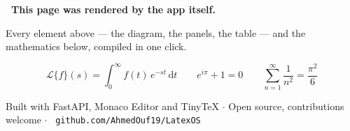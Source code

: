 \documentclass[a4paper,10pt]{article}
\begin{document}
\begin{tcolorbox}[colback=paper, colframe=accent!55!white, boxrule=0.6pt,
                  arc=3pt, left=10pt, right=10pt, top=7pt, bottom=7pt]
  \begin{center}
    {\color{accent}\bfseries\faCheckCircle~This page was rendered by the app itself.}\par\vspace{2pt}
    {\footnotesize Every element above --- the diagram, the panels, the table ---
     and the mathematics below, compiled in one click.}
  \end{center}
  \vspace{2pt}
  \[
    \mathcal{L}\{f\}(s)=\int_{0}^{\infty} f(t)\,e^{-st}\,\mathrm{d}t
    \qquad
    e^{i\pi}+1=0
    \qquad
    \sum_{n=1}^{\infty}\frac{1}{n^{2}}=\frac{\pi^{2}}{6}
  \]
\end{tcolorbox}

\vfill

\begin{center}
  {\color{muted}\footnotesize
  Built with FastAPI, Monaco Editor and TinyTeX \; $\cdot$ \;
  Open source, contributions welcome \; $\cdot$ \;
  \faGithub~\texttt{github.com/AhmedOuf19/LatexOS}}
\end{center}
\end{document}
